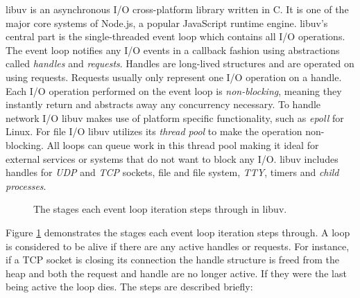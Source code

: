 libuv is an asynchronous I/O cross-platform library written in C. It is one of
the major core systems of Node.js, a popular JavaScript runtime engine. libuv's
central part is the single-threaded event loop which contains all I/O
operations. The event loop notifies any I/O events in a callback fashion using
abstractions called \textit{handles} and \textit{requests}. Handles are
long-lived structures and are operated on using requests. Requests usually only
represent one I/O operation on a handle. Each I/O operation performed on the
event loop is \textit{non-blocking}, meaning they instantly return and
abstracts away any concurrency necessary. To handle network I/O libuv makes use
of platform specific functionality, such as \textit{epoll} for Linux. For file
I/O libuv utilizes its \textit{thread pool} to make the operation non-blocking.
All loops can queue work in this thread pool making it ideal for external
services or systems that do not want to block any I/O. libuv includes handles
for \textit{UDP} and \textit{TCP} sockets, file and file system, \textit{TTY},
timers and \textit{child processes}. \cite{libuv-docs}

\begin{figure}[h!]
\centering
    \caption[The libuv event loop.]{The stages each event loop iteration steps
    through in libuv.}
    \label{fig:loop_iteration}
\end{figure}

Figure \ref{fig:loop_iteration} demonstrates the stages each event loop
iteration steps through. A loop is considered to be alive if there are any
active handles or requests. For instance, if a TCP socket is closing its
connection the handle structure is freed from the heap and both the request and
handle are no longer active. If they were the last being active the loop dies.
The steps are described briefly: \cite{libuv-docs}


